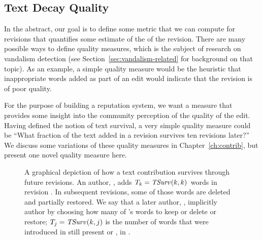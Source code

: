 \subsection{Text Decay Quality}

In the abstract, our goal is to define some metric that we can compute for
revisions that quantifies some estimate of the  of the
revision.
There are many possible ways to define quality measures, which is the
subject of research on vandalism detection (see
Section~\ref{sec:vandalism-related} for background on that topic).
As an example, a simple quality measure would be the heuristic that
inappropriate words added as part of an edit would indicate that the revision
is of poor quality.

For the purpose of building a reputation system, we want a measure
that provides some insight into the community perception of the
quality of the edit.
Having defined the notion of text survival, a very simple quality measure
could be ``What fraction of the text added in a revision survives
ten revisions later?''
We discuss some variations of these quality measures in
Chapter~\ref{ch:contrib}, but present one novel quality measure here.

\begin{figure}[htbp]
\centering
{}
\caption{A graphical depiction of how a text contribution survives
	through future revisions.
        An author, , adds
    $T_k = \mathit{TSurv}_{}(k,k)$ words in revision .  In subsequent
    revisions, some of those words are deleted and partially restored.
    We say that a later author, , implicitly 
    author  by choosing how many of 's words
    to keep or delete or restore; $T_j = \mathit{TSurv}_{}(k,j)$ is the number of words
    that were introduced in  still present or
    , in .
}
\label{fig:textsurvival} 
\end{figure}


